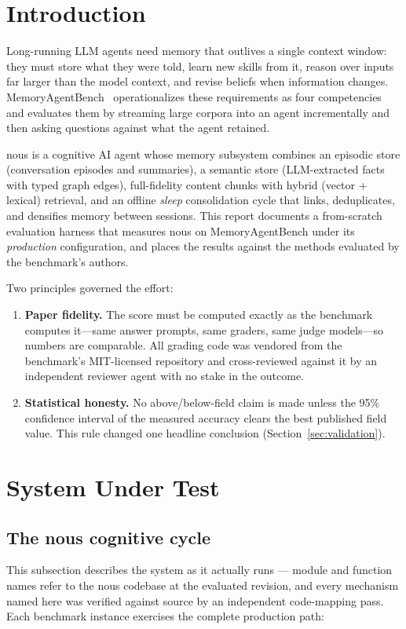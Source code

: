 \documentclass{article}
\newcommand{\nous}{\textsf{nous}}
\newcommand{\mab}{MemoryAgentBench}
\begin{document}
\section{Introduction}

Long-running LLM agents need memory that outlives a single context window:
they must store what they were told, learn new skills from it, reason over
inputs far larger than the model context, and revise beliefs when information
changes. \mab{}~\cite{mab} operationalizes these requirements as four
competencies and evaluates them by streaming large corpora into an agent
incrementally and then asking questions against what the agent retained.

\nous{} is a cognitive AI agent whose memory subsystem combines an episodic
store (conversation episodes and summaries), a semantic store (LLM-extracted
facts with typed graph edges), full-fidelity content chunks with hybrid
(vector + lexical) retrieval, and an offline \emph{sleep} consolidation cycle
that links, deduplicates, and densifies memory between sessions. This report
documents a from-scratch evaluation harness that measures \nous{} on \mab{}
under its \emph{production} configuration, and places the results against the
methods evaluated by the benchmark's authors.

Two principles governed the effort:
\begin{enumerate}
  \item \textbf{Paper fidelity.} The score must be computed exactly as the
        benchmark computes it---same answer prompts, same graders, same judge
        models---so numbers are comparable. All grading code was vendored from
        the benchmark's MIT-licensed repository and cross-reviewed against it
        by an independent reviewer agent with no stake in the outcome.
  \item \textbf{Statistical honesty.} No above/below-field claim is made unless
        the 95\% confidence interval of the measured accuracy clears the
        best published field value. This rule changed one headline conclusion
        (Section~\ref{sec:validation}).
\end{enumerate}

\section{System Under Test}

\subsection{The \nous{} cognitive cycle}
This subsection describes the system as it actually runs --- module and
function names refer to the \nous{} codebase at the evaluated revision, and
every mechanism named here was verified against source by an independent
code-mapping pass. Each benchmark instance exercises the complete production
path:
\end{document}
